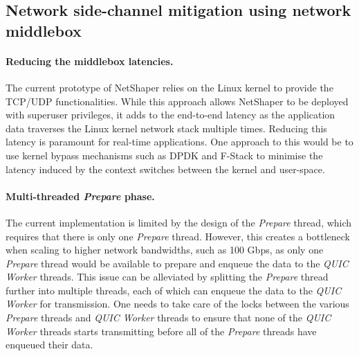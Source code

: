 \subsection{Network side-channel mitigation using network middlebox}
\label{subsec:future-work-netshaper}

\paragraph{Reducing the middlebox latencies.}
The current prototype of NetShaper relies on the Linux kernel to provide the TCP/UDP functionalities. 
While this approach allows NetShaper to be deployed with superuser privileges, it adds to the end-to-end latency as the application data traverses the Linux kernel network stack multiple times.
Reducing this latency is paramount for real-time applications.
One approach to this would be to use kernel bypass mechanisms such as DPDK \cite{dpdk} and F-Stack \cite{fstack} to minimise the latency induced by the context switches between the kernel and user-space.

\paragraph{Multi-threaded \textit{Prepare} phase.}
The current implementation is limited by the design of the \textit{Prepare} thread, which requires that there is only one \textit{Prepare} thread.
However, this creates a bottleneck when scaling to higher network bandwidths, such as 100 Gbps, as only one \textit{Prepare} thread would be available to prepare and enqueue the data to the \textit{QUIC Worker} threads.
This issue can be alleviated by splitting the \textit{Prepare} thread further into multiple threads, each of which can enqueue the data to the \textit{QUIC Worker} for transmission.
One needs to take care of the locks between the various \textit{Prepare} threads and \textit{QUIC Worker} threads to ensure that none of the \textit{QUIC Worker} threads starts transmitting before all of the \textit{Prepare} threads have enqueued their data.

